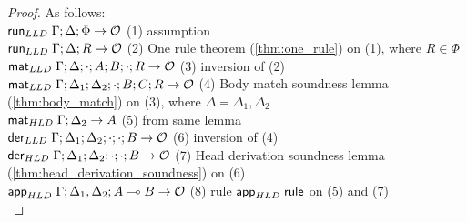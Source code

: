 \begin{proof}
As follows:\\
$\mathsf{run}_{LLD} \; \Gamma; \Delta; \Phi \rightarrow \mathcal{O}$ \hfill (1) assumption \\
$\mathsf{run}_{LLD} \; \Gamma; \Delta; R \rightarrow \mathcal{O}$ \hfill (2) One rule theorem (\ref{thm:one_rule}) on (1), where $R \in \Phi$ \\
$\mathsf{mat}_{LLD} \; \Gamma; \Delta; \cdot; A; B; \cdot; R \rightarrow \mathcal{O}$ \hfill (3) inversion of (2) \\
$\mathsf{mat}_{LLD} \; \Gamma; \Delta_1; \Delta_2; \cdot; B; C; R \rightarrow \mathcal{O}$ \hfill (4) Body match soundness lemma (\ref{thm:body_match}) on (3), where $\Delta = \Delta_1, \Delta_2$ \\
$\mathsf{mat}_{HLD} \; \Gamma; \Delta_2 \rightarrow A$ \hfill (5) from same lemma \\
$\mathsf{der}_{LLD} \; \Gamma; \Delta_1; \Delta_2; \cdot; \cdot; B \rightarrow \mathcal{O}$ \hfill (6) inversion of (4) \\
$\mathsf{der}_{HLD} \; \Gamma; \Delta_1; \Delta_2; \cdot; \cdot; B \rightarrow \mathcal{O}$ \hfill (7) Head derivation soundness lemma (\ref{thm:head_derivation_soundness}) on (6) \\
$\mathsf{app}_{HLD} \; \Gamma ; \Delta_1, \Delta_2 ; A \multimap B \rightarrow \mathcal{O}$ \hfill (8) rule $\mathsf{app}_{HLD} \; \mathsf{rule}$ on (5) and (7)\\
\end{proof}
